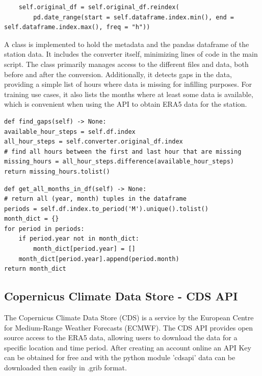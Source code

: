 \begin{lstlisting}
    self.original_df = self.original_df.reindex(
        pd.date_range(start = self.dataframe.index.min(), end = self.dataframe.index.max(), freq = "h"))
\end{lstlisting}

A class  is implemented to hold the metadata and the pandas dataframe of the station data.
It includes the converter itself, minimizing lines of code in the main script.
The class primarily manages access to the different files and data, both before and after the conversion.
Additionally, it detects gaps in the data, providing a simple list of hours where data is missing for infilling purposes.
For training use cases, it also lists the months where at least some data is available, which is convenient when using the API to obtain ERA5 data for the station.


\begin{lstlisting}[caption=Gap Detection in Station Class, label=lst:find_gaps]
def find_gaps(self) -> None:
available_hour_steps = self.df.index
all_hour_steps = self.converter.original_df.index
# find all hours between the first and last hour that are missing
missing_hours = all_hour_steps.difference(available_hour_steps)
return missing_hours.tolist()
\end{lstlisting}

\begin{lstlisting}[caption=Detection of available ranges in Station Class, label=lst:available_ranges]
def get_all_months_in_df(self) -> None:
# return all (year, month) tuples in the dataframe
periods = self.df.index.to_period('M').unique().tolist()
month_dict = {}
for period in periods:
    if period.year not in month_dict:
        month_dict[period.year] = []
    month_dict[period.year].append(period.month)
return month_dict
\end{lstlisting}

\subsection{Copernicus Climate Data Store - CDS API}
\label{sec: cds_api}

The Copernicus Climate Data Store (CDS) is a service by the European Centre for Medium-Range Weather Forecasts (ECMWF).
The CDS API provides open source access to the ERA5 data, allowing users to download the data for a specific location and time period.
After creating an account online an API Key can be obtained for free and with the python module 'cdsapi' data can be downloaded then easily in .grib format. 

